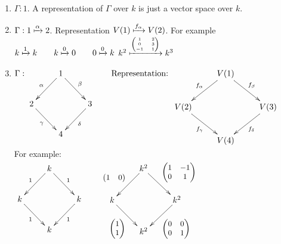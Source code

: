 \begin{exam}
\begin{enumerate}[(1)]
    \item \(\Gamma: 1.\) A representation of \(\Gamma\) over \(k\) is just a vector space over \(k\).
    \item \(\Gamma: 1\xmapsto{\alpha}2\). Representation \(V(1)\xmapsto{f_\alpha}V(2)\). For example \\
    \(k\xmapsto{1}k\quad\quad k\xmapsto{0}0\quad\quad 0\xmapsto{0}k\)\quad\quad
    \(k^2\xmapsto{\tiny\begin{pmatrix} 1 & 2\\ 0 & 3 \\ -1 & 1 \end{pmatrix}}k^3\) \\
    \item \(\Gamma: \xymatrix{ & 1\ar[dl]_\alpha \ar[dr]^\beta & \\
    2\ar[dr]_{\gamma} & & 3 \ar[dl]^\delta \\
    & 4 & }
    \quad\quad \text{Representation: }\xymatrix{ & V(1)\ar[dl]_{f_\alpha} \ar[dr]^{f_\beta} & \\
    V(2)\ar[dr]_{f_\gamma} & & V(3) \ar[dl]^{f_\delta} \\
    & V(4) & }\)\\
    For example:\\
    \(\xymatrix{ & k\ar[dl]_{1} \ar[dr]^{1} & \\
    k\ar[dr]_{1} & & k \ar[dl]^{1}\\
    & k & }\quad\quad\xymatrix{ & k^2\ar[dl]_{\small\begin{pmatrix} 1 & 0 \end{pmatrix}} \ar[dr]^{\small\begin{pmatrix} 1 & -1 \\ 0 & 1 \end{pmatrix}} & \\
    k\ar[dr]_{\small\begin{pmatrix} 1 \\ 1 \end{pmatrix}} & & k^2 \ar[dl]^{\small\begin{pmatrix} 0 & 0\\ 0 & 1 \end{pmatrix}}\\
    & k^2 & }\)
\end{enumerate}
\end{exam}
